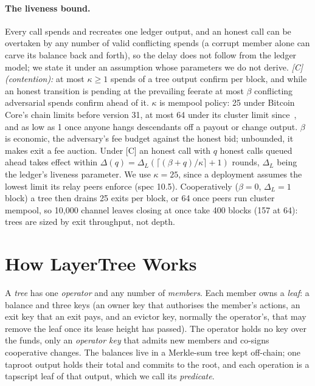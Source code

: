 \documentclass[runningheads]{llncs}
\newif\iffullversion
\newcommand{\lat}{\ensuremath{\Delta}}
\begin{document}
\paragraph{The liveness bound.}\label{sec:liveness} Every call spends and recreates one
ledger output, and an honest call can be overtaken by any number of
valid conflicting spends (a corrupt member alone can carve its balance
back and forth), so the delay does not follow from the ledger model; we
state it under an assumption whose parameters we do not derive. \emph{[C] (contention):} at most
$\kappa \ge 1$ spends of a tree output confirm per block, and while an
honest transition is pending at the prevailing feerate at most $\beta$
conflicting adversarial spends confirm ahead of it. $\kappa$ is mempool
policy: 25 under Bitcoin Core's chain limits before version 31, at
most 64 under its cluster limit since~\cite{corepolicy,clustermempool},
and as low as 1 once anyone hangs
descendants off a payout or change output. $\beta$ is economic, the
adversary's fee budget against the honest bid; unbounded, it makes exit
a fee auction. Under [C] an honest call with $q$ honest calls queued
ahead takes effect within
$\lat(q) = \lat_L(\lceil (\beta + q)/\kappa \rceil + 1)$ rounds, $\lat_L$
being the ledger's liveness parameter. We use $\kappa = 25$, since a
deployment assumes the lowest limit its relay peers enforce (spec 10.5).
Cooperatively ($\beta = 0$, $\lat_L = 1$ block) a tree then drains 25
exits per block, or 64 once peers run cluster mempool, so 10{,}000
channel leaves closing at once take 400 blocks (157 at 64): trees are
sized by exit throughput, not depth.

\fi

\iffullversion
\section{The Abstract Protocol}\label{sec:protocol}\label{sec:construction}

The protocol $\Pi$ has a data structure whose root one output commits
to, one \emph{predicate} per interface, enforced by the ledger, and the
behaviour of honest parties.
\else
\section{How LayerTree Works}\label{sec:howitworks}

A \emph{tree} has one \emph{operator} and any number of \emph{members}.
Each member owns a \emph{leaf}: a balance and three keys (an owner key
that authorises the member's actions, an exit key that an exit pays, and
an evictor key, normally the operator's, that may remove the leaf once
its lease height has passed). The operator holds no key over the funds,
only an \emph{operator key} that admits new members and co-signs
cooperative changes. The balances live in a Merkle-sum tree kept
off-chain; one taproot output holds their total and commits to the root,
and each operation is a tapscript leaf of that output, which we call its
\emph{predicate}.
\fi
\end{document}
